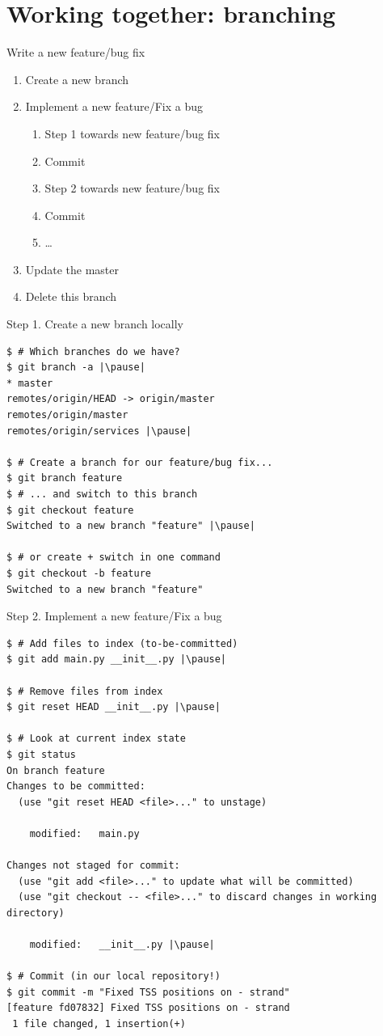 \section{Working together: branching}

\begin{frame}[fragile]{Write a new feature/bug fix}
	\begin{enumerate}
		\item Create a new branch
		\item Implement a new feature/Fix a bug
		\begin{enumerate}
			\item Step 1 towards new feature/bug fix
			\item Commit
			\item Step 2 towards new feature/bug fix
			\item Commit
			\item \ldots
		\end{enumerate}
		\item Update the master
		\item Delete this branch 
	\end{enumerate}
\end{frame}

\begin{frame}[fragile]{Step 1. Create a new branch locally}
	\begin{lstlisting}
$ # Which branches do we have?
$ git branch -a |\pause|
* master
remotes/origin/HEAD -> origin/master
remotes/origin/master
remotes/origin/services |\pause|

$ # Create a branch for our feature/bug fix...
$ git branch feature
$ # ... and switch to this branch
$ git checkout feature 
Switched to a new branch "feature" |\pause|

$ # or create + switch in one command
$ git checkout -b feature 
Switched to a new branch "feature"
  	\end{lstlisting}
\end{frame}

\begin{frame}[fragile]{Step 2. Implement a new feature/Fix a bug}
  	\begin{lstlisting}
$ # Add files to index (to-be-committed)
$ git add main.py __init__.py |\pause|

$ # Remove files from index
$ git reset HEAD __init__.py |\pause|

$ # Look at current index state
$ git status
On branch feature
Changes to be committed:
  (use "git reset HEAD <file>..." to unstage)

	modified:   main.py

Changes not staged for commit:
  (use "git add <file>..." to update what will be committed)
  (use "git checkout -- <file>..." to discard changes in working directory)

	modified:   __init__.py |\pause|

$ # Commit (in our local repository!)
$ git commit -m "Fixed TSS positions on - strand"
[feature fd07832] Fixed TSS positions on - strand
 1 file changed, 1 insertion(+)
  	\end{lstlisting}
\end{frame}


